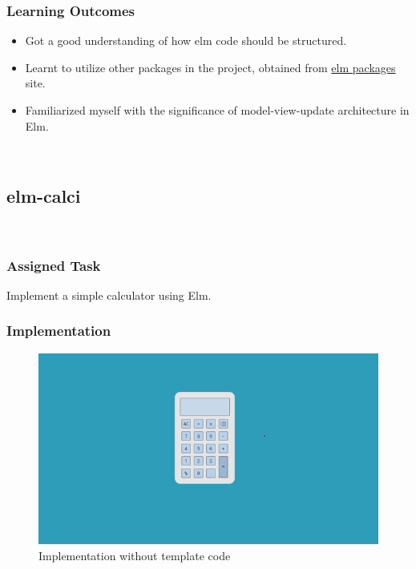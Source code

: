 \begin{FlushLeft}
\cleardoublepage

\subsubsection{Learning Outcomes}
\begin{itemize}
    \item Got a good understanding of how elm code should be structured.
    \item Learnt to utilize other packages in the project, obtained from \href{https://package.elm-lang.org/}{elm packages} site.
    \item Familiarized myself with the significance of model-view-update architecture in Elm. 
\end{itemize}

\\[1in]
\subsection{elm-calci}
\\[0.1in]
\subsubsection{Assigned Task}
Implement a simple calculator using Elm. 
\\[0.5in]
\subsubsection{Implementation}

\begin{figure}[h]
    \centering
    \includegraphics[width=5in]{imgs/elm-calci-1.png}
    \caption{Implementation without template code}
\end{figure}


\end{FlushLeft}
